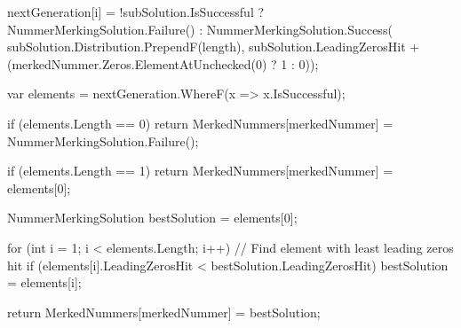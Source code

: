 \documentclass[a4paper,10pt,ngerman]{scrartcl}
\begin{document}
\begin{lstcs}
{{        nextGeneration[i] = !subSolution.IsSuccessful
            ? NummerMerkingSolution.Failure()
            : NummerMerkingSolution.Success(
                subSolution.Distribution.PrependF(length),
                subSolution.LeadingZerosHit + (merkedNummer.Zeros.ElementAtUnchecked(0) ? 1 : 0));
    }

    var elements = nextGeneration.WhereF(x => x.IsSuccessful);

    if (elements.Length == 0)
    {
        return MerkedNummers[merkedNummer] = NummerMerkingSolution.Failure();
    }

    if (elements.Length == 1)
    {
        return MerkedNummers[merkedNummer] = elements[0];
    }

    NummerMerkingSolution bestSolution = elements[0];

    for (int i = 1; i < elements.Length; i++)
    {
        // Find element with least leading zeros hit
        if (elements[i].LeadingZerosHit < bestSolution.LeadingZerosHit)
        {
            bestSolution = elements[i];
        }
    }

    return MerkedNummers[merkedNummer] = bestSolution;
}
\end{lstcs}
\end{document}
